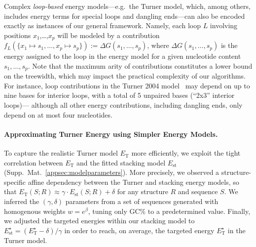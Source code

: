 \documentclass[]{bmcart}
\newcommand{\Def}[1]{\emph{#1}}
\newcommand{\Nuc}[1]{{\sf #1}}
\newcommand{\Cb}{\Nuc{C}}
\newcommand{\Gb}{\Nuc{G}}
\newcommand{\GCb}{\Gb\Cb}
\newcommand{\EnergyTurner}{E_{\text{T}}}
\newcommand{\EnergyStacking}{E_{\text{st}}}
\newcommand{\citep}[1]{\cite{#1}}
\begin{document}
Complex \Def{loop-based}
 energy models---e.g.~the Turner model,
which, among others, includes energy terms for special loops and dangling
ends---can also be encoded exactly as instances of our general framework. Namely, each loop $L$ involving positions $x_1$,\ldots,$x_p$ will be modeled by a contribution $f_L(\{x_1\mapsto s_1,\ldots, x_p\mapsto s_p\}):=\Delta G(s_1,\ldots,s_p)$, where $\Delta G(s_1,\ldots,s_p)$ is the energy assigned to the loop in the energy model for a given nucleotide content $s_1,\ldots,s_p$. Note that the maximum arity of contributions constitutes a lower bound on the treewidth, which may impact the practical complexity of our algorithms. For instance, loop contributions in the Turner 2004 model~\citep{Turner2009} may depend on up to
nine bases for interior loops, with a total of 5 unpaired bases (``2x3'' interior loops)--- although all other energy contributions, including dangling ends, only depend on at most four nucleotides.




\paragraph{Approximating Turner Energy using Simpler Energy Models.}
To capture the realistic Turner model $\EnergyTurner$ more efficiently, we exploit the tight correlation between
$\EnergyTurner$ and the fitted stacking model $\EnergyStacking$
(Supp.\ Mat.~\ref{appsec:modelparameters}). More precisely, we observed a
structure-specific affine dependency between the Turner and stacking
energy models, so that
$\EnergyTurner(S;R) \approx \gamma\cdot \EnergyStacking(S;R) + \delta$
for any structure $R$ and sequence $S$. We inferred the
$(\gamma,\delta)$ parameters from a set of sequences generated with
homogenous weights $w=e^{\beta}$, tuning only \GCb\% to a
predetermined value.  Finally, we adjusted the targeted energies
within our stacking model to
$\EnergyStacking^{\star} = (\EnergyTurner^{\star}- \delta)/\gamma$ in
order to reach, on average, the targeted energy
$\EnergyTurner^{\star}$ in the Turner model.
\end{document}
